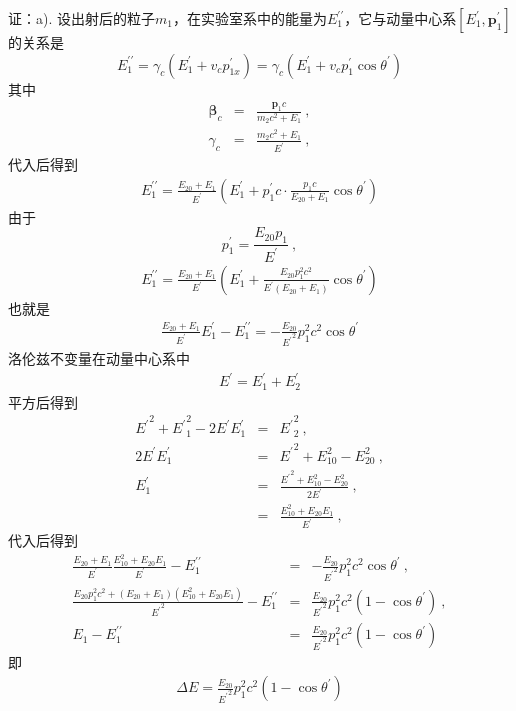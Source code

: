 \documentclass[11pt,a4paper]{article}
\renewcommand{\vec}[1]{\boldsymbol{#1}}
\begin{document}
证：a). 设出射后的粒子$m_1$，在实验室系中的能量为$E^{\prime \prime}_1$，它与动量中心系$[E^{\prime}_1, \vec{p}^{\prime}_1]$的关系是
\begin{equation*}
E^{\prime \prime}_1 = \gamma_c (E^{\prime}_1 +v_c p^{\prime}_{1x}) = \gamma_c (E^{\prime}_1 +v_c p^{\prime}_{1} \cos \theta^{\prime})
\end{equation*}
其中
\begin{eqnarray*}
\vec{\beta}_c &=&  \frac{\vec{p}_1 c}{m_2 c^2 +E_1} ~, \\
\gamma_c &=& \frac{m_2 c^2 +E_1}{E^{\prime}} ~,
\end{eqnarray*}
代入后得到
\begin{eqnarray*}
E^{\prime \prime}_1 = \frac{E_{20} +E_1}{E^{\prime}} \left(E^{\prime}_1 +p^{\prime}_{1} c \cdot \frac{p_1 c}{E_{20} +E_1} \cos \theta^{\prime}  \right)
\end{eqnarray*}
由于
\begin{equation*}
p^{\prime}_{1} = \frac{E_{20} p_1}{E^{\prime}} ~,
\end{equation*}
\begin{eqnarray*}
E^{\prime \prime}_1 = \frac{E_{20} +E_1}{E^{\prime}} \left(E^{\prime}_1 +\frac{E_{20} p^2_1 c^2}{E^{\prime}(E_{20} +E_1)} \cos \theta^{\prime}  \right)
\end{eqnarray*}
也就是
\begin{eqnarray*}
\frac{E_{20} +E_1}{E^{\prime}} E^{\prime}_1 - E^{\prime \prime}_1 = - \frac{E_{20}}{{E^{\prime}}^2}   p^2_1 c^2 \cos \theta^{\prime}
\end{eqnarray*}
洛伦兹不变量在动量中心系中
\begin{eqnarray*}
E^{\prime} = E^{\prime}_1 +E^{\prime}_2
\end{eqnarray*}
平方后得到
\begin{eqnarray*}
{E^{\prime}}^2 + {E^{\prime}}^2_1 -2E^{\prime} E^{\prime}_1 &=& {E^{\prime}}^2_2 ~, \\
2E^{\prime} E^{\prime}_1 &=& {E^{\prime}}^2 +E_{10}^2 -E_{20}^2 ~, \\
E^{\prime}_1 &=& \frac{{E^{\prime}}^2 +E_{10}^2 -E_{20}^2}{2E^{\prime}} ~, \\
&=& \frac{E_{10}^2 +E_{20} E_1}{E^{\prime}} ~,
\end{eqnarray*}
代入后得到
\begin{eqnarray*}
\frac{E_{20} +E_1}{E^{\prime}} \frac{E_{10}^2 +E_{20} E_1}{E^{\prime}} -E^{\prime \prime}_1 &=& - \frac{E_{20}}{{E^{\prime}}^2}   p^2_1 c^2 \cos \theta^{\prime} ~, \\
\frac{E_{20} p^2_1 c^2 +(E_{20} +E_1)(E_{10}^2 +E_{20} E_1)}{{E^{\prime}}^2}  -E^{\prime \prime}_1 &=& \frac{E_{20}}{{E^{\prime}}^2}  p^2_1 c^2 (1 -\cos \theta^{\prime}) ~, \\
E_1 - E^{\prime \prime}_1 &=&  \frac{E_{20}}{{E^{\prime}}^2}  p^2_1 c^2 (1 -\cos \theta^{\prime})
\end{eqnarray*}
即
\begin{eqnarray*}
\Delta E =  \frac{E_{20}}{{E^{\prime}}^2}  p^2_1 c^2 (1 -\cos \theta^{\prime})
\end{eqnarray*}
\end{document}
